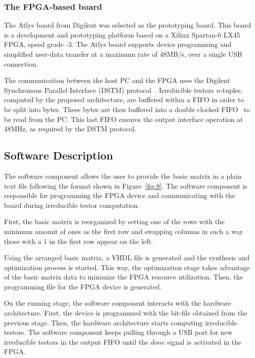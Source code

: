 \documentclass[letterpaper, twoside, openright, 12pt]{book}%
\begin{document}
%	
\subsubsection*{The FPGA-based board}
%
	The Atlys board from Digilent \citep{Digilent2013} was selected as the prototyping board. This board is a development and prototyping platform based on a Xilinx Spartan-6 LX45 FPGA, speed grade -3. The Atlys board supports device programming and simplified user-data transfer at a maximum rate of 48MB/s, over a single USB connection. 
	
	The communication between the host PC and the FPGA uses the Digilent Synchronous Parallel Interface (DSTM) protocol~\citep{Digilent2010}. Irreducible testors $n$-tuples, computed by the proposed architecture, are buffered within a FIFO in order to be split into bytes. These bytes are then buffered into a double clocked FIFO~\citep{XilinxInc.2012} to be read from the PC. This last FIFO ensures the output interface operation at 48MHz, as required by the DSTM protocol.

%	
\subsection{Software Description}\label{sect:soft}
%
	The software component allows the user to provide the basic matrix in a plain text file following the format shown in Figure~\ref{fig:8}. The software component is responsible for programming the FPGA device and communicating with the board during irreducible testor computation.

	First, the basic matrix is reorganized by setting one of the rows with the minimum amount of ones as the first row and swapping columns in such a way those with a 1 in the first row appear on the left. 

	Using the arranged basic matrix, a VHDL file is generated and the synthesis and optimization process is started. This way, the optimization stage takes advantage of the basic matrix data to minimize the FPGA resource utilization. Then, the programming file for the FPGA device is generated.

	On the running stage, the software component interacts with the hardware architecture. First, the device is programmed with the bit-file obtained from the previous stage. Then, the hardware architecture starts computing irreducible testors. The software component keeps pulling through a USB port for new irreducible testors in the output FIFO until the $done$ signal is activated in the FPGA.
\end{document}
